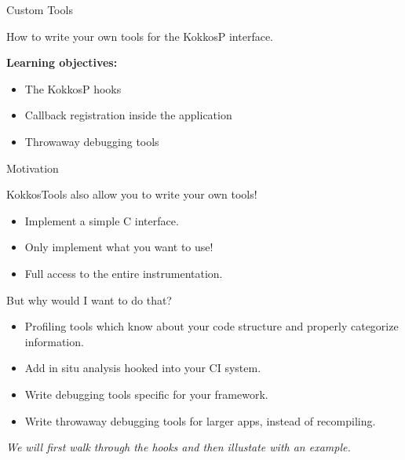 \begin{frame}[fragile]

  {\Huge Custom Tools}

  \vspace{10pt}

  {\large How to write your own tools for the KokkosP interface.}

  \vspace{20pt}

  \textbf{Learning objectives:}
  \begin{itemize}
    \item {The KokkosP hooks}
    \item {Callback registration inside the application}
    \item {Throwaway debugging tools}
  \end{itemize}

  \vspace{-20pt}

\end{frame}


\begin{frame}[fragile]{Motivation}

KokkosTools also allow you to write your own tools!

\begin{itemize}
  \item Implement a simple C interface.
  \item Only implement what you want to use!
  \item Full access to the entire instrumentation.
\end{itemize}

\vspace{10pt}
But why would I want to do that?

\begin{itemize}
  \item Profiling tools which know about your code structure and properly categorize information.
  \item Add in situ analysis hooked into your CI system.
  \item Write debugging tools specific for your framework.
  \item Write throwaway debugging tools for larger apps, instead of recompiling.
\end{itemize}

\pause
\textit{We will first walk through the hooks and then illustate with an example.}
\end{frame}


